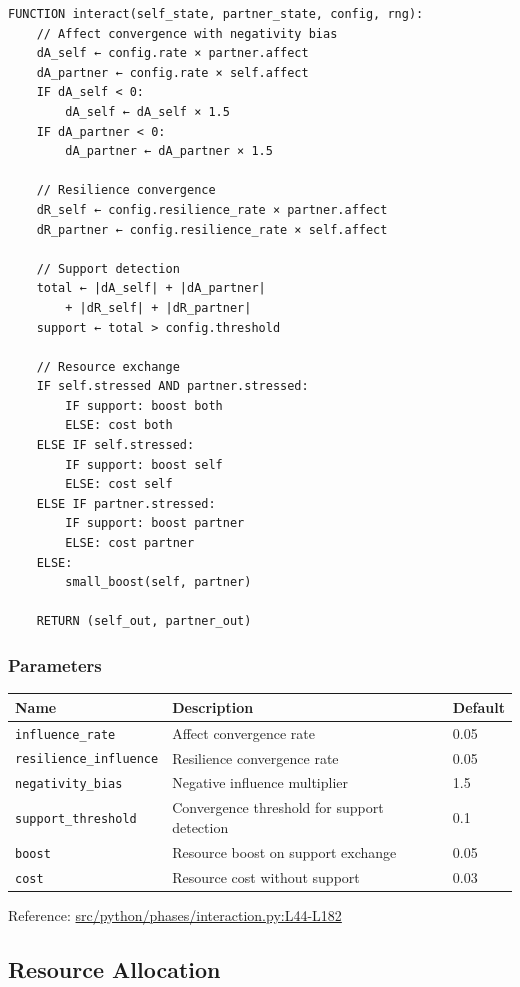 \documentclass[
  letterpaper,
  DIV=11,
  numbers=noendperiod]{scrartcl}
\newcommand{\trow}[3]{%
  \texttt{\allowbreak #1} & #2 & #3 \\
}
\begin{document}
\begin{verbatim}
FUNCTION interact(self_state, partner_state, config, rng):
    // Affect convergence with negativity bias
    dA_self ← config.rate × partner.affect
    dA_partner ← config.rate × self.affect
    IF dA_self < 0:
        dA_self ← dA_self × 1.5
    IF dA_partner < 0:
        dA_partner ← dA_partner × 1.5

    // Resilience convergence
    dR_self ← config.resilience_rate × partner.affect
    dR_partner ← config.resilience_rate × self.affect

    // Support detection
    total ← |dA_self| + |dA_partner|
        + |dR_self| + |dR_partner|
    support ← total > config.threshold

    // Resource exchange
    IF self.stressed AND partner.stressed:
        IF support: boost both
        ELSE: cost both
    ELSE IF self.stressed:
        IF support: boost self
        ELSE: cost self
    ELSE IF partner.stressed:
        IF support: boost partner
        ELSE: cost partner
    ELSE:
        small_boost(self, partner)

    RETURN (self_out, partner_out)
\end{verbatim}

\subsubsection{Parameters}\label{parameters-3}

\begin{tabularx}{\textwidth}{p{4.5cm}Xp{2cm}}
\toprule
\textbf{Name} & \textbf{Description} & \textbf{Default} \\
\midrule
\trow{influence\_rate}{Affect convergence rate}{0.05}
\trow{resilience\_influence}{Resilience convergence rate}{0.05}
\trow{negativity\_bias}{Negative influence multiplier}{1.5}
\trow{support\_threshold}{Convergence threshold for support detection}{0.1}
\trow{boost}{Resource boost on support exchange}{0.05}
\trow{cost}{Resource cost without support}{0.03}
\bottomrule
\end{tabularx}

Reference:
\href{https://github.com/namakala/abm-simulation/blob/84ff9b37fb0c569bef9f122e789d9c23a89348ec/src/python/phases/interaction.py\#L44-L182}{src/python/phases/interaction.py:L44-L182}

\subsection{Resource Allocation}\label{resource-allocation}
\end{document}
